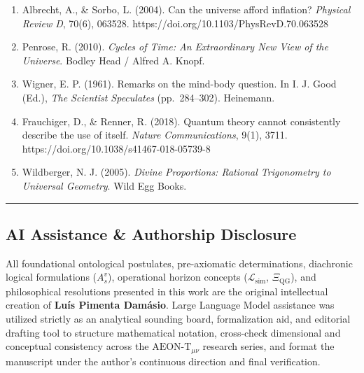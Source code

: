 \documentclass[
]{article}
\begin{document}
\begin{enumerate}
  Dyson, L., Kleban, M., \& Susskind, L. (2002). Disturbing implications
  of a cosmological constant. \emph{Journal of High Energy Physics},
  2002(10), 011. https://doi.org/10.1088/1126-6708/2002/10/011
\item
  Albrecht, A., \& Sorbo, L. (2004). Can the universe afford inflation?
  \emph{Physical Review D}, 70(6), 063528.
  https://doi.org/10.1103/PhysRevD.70.063528
\item
  Penrose, R. (2010). \emph{Cycles of Time: An Extraordinary New View of
  the Universe}. Bodley Head / Alfred A. Knopf.
\item
  Wigner, E. P. (1961). Remarks on the mind-body question. In I. J. Good
  (Ed.), \emph{The Scientist Speculates} (pp.~284--302). Heinemann.
\item
  Frauchiger, D., \& Renner, R. (2018). Quantum theory cannot
  consistently describe the use of itself. \emph{Nature Communications},
  9(1), 3711. https://doi.org/10.1038/s41467-018-05739-8
\item
  Wildberger, N. J. (2005). \emph{Divine Proportions: Rational
  Trigonometry to Universal Geometry}. Wild Egg Books.
\end{enumerate}

\begin{center}\rule{0.5\linewidth}{0.5pt}\end{center}

\subsection{AI Assistance \& Authorship
Disclosure}\label{ai-assistance-authorship-disclosure}

All foundational ontological postulates, pre-axiomatic determinations,
diachronic logical formulations (\(A_s^v\)), operational horizon
concepts (\(\mathcal{L}_{\mathrm{sim}}\), \(\Xi_{\mathrm{QG}}\)), and
philosophical resolutions presented in this work are the original
intellectual creation of \textbf{Luís Pimenta Damásio}. Large Language
Model assistance was utilized strictly as an analytical sounding board,
formalization aid, and editorial drafting tool to structure mathematical
notation, cross-check dimensional and conceptual consistency across the
\(\text{AEON-T}_{\mu\nu}\) research series, and format the manuscript
under the author's continuous direction and final verification.
\end{document}
